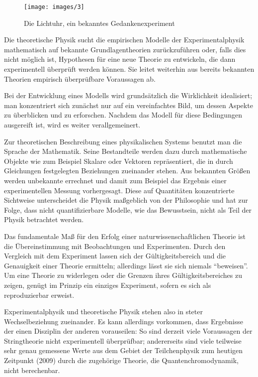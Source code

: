 \documentclass[titlepage, parkskip=full, twocolumn, landscape]{scrartcl}
\begin{document}
\begin{figure}
	\centering
	\texttt{[image: images/3]}
	\caption{Die Lichtuhr, ein bekanntes Gedankenexperiment}
\end{figure}

Die theoretische Physik sucht die empirischen Modelle der Experimentalphysik mathematisch auf bekannte Grundlagentheorien zurückzuführen oder, falls dies nicht möglich ist, Hypothesen für eine neue Theorie zu entwickeln, die dann experimentell überprüft werden können. Sie leitet weiterhin aus bereits bekannten Theorien empirisch überprüfbare Voraussagen ab.

Bei der Entwicklung eines Modells wird grundsätzlich die Wirklichkeit idealisiert; man konzentriert sich zunächst nur auf ein vereinfachtes Bild, um dessen Aspekte zu überblicken und zu erforschen. Nachdem das Modell für diese Bedingungen ausgereift ist, wird es weiter verallgemeinert.

Zur theoretischen Beschreibung eines physikalischen Systems benutzt man die Sprache der Mathematik. Seine Bestandteile werden dazu durch mathematische Objekte wie zum Beispiel Skalare oder Vektoren repräsentiert, die in durch Gleichungen festgelegten Beziehungen zueinander stehen. Aus bekannten Größen werden unbekannte errechnet und damit zum Beispiel das Ergebnis einer experimentellen Messung vorhergesagt. Diese auf Quantitäten konzentrierte Sichtweise unterscheidet die Physik maßgeblich von der Philosophie und hat zur Folge, dass nicht quantifizierbare Modelle, wie das Bewusstsein, nicht als Teil der Physik betrachtet werden.

Das fundamentale Maß für den Erfolg einer naturwissenschaftlichen Theorie ist die Übereinstimmung mit Beobachtungen und Experimenten. Durch den Vergleich mit dem Experiment lassen sich der Gültigkeitsbereich und die Genauigkeit einer Theorie ermitteln; allerdings lässt sie sich niemals "`beweisen"'. Um eine Theorie zu widerlegen oder die Grenzen ihres Gültigkeitsbereiches zu zeigen, genügt im Prinzip ein einziges Experiment, sofern es sich als reproduzierbar erweist.

Experimentalphysik und theoretische Physik stehen also in steter Wechselbeziehung zueinander. Es kann allerdings vorkommen, dass Ergebnisse der einen Disziplin der anderen vorauseilen: So sind derzeit viele Voraussagen der Stringtheorie nicht experimentell überprüfbar; andererseits sind viele teilweise sehr genau gemessene Werte aus dem Gebiet der Teilchenphysik zum heutigen Zeitpunkt (2009) durch die zugehörige Theorie, die Quantenchromodynamik, nicht berechenbar.
\end{document}
